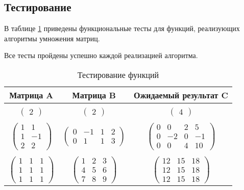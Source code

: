 \subsection{Тестирование}

В таблице \ref{tabular:func_test} приведены функциональные тесты для функций, реализующих алгоритмы умножения матриц. 

Все тесты пройдены успешно каждой реализацией алгоритма.

\begin{table}[h!]
	\begin{center}
	    \begin{threeparttable}
	    \captionsetup{justification=raggedright, singlelinecheck=off}
	    \caption{\label{tabular:func_test} Тестирование функций}
		\begin{tabular}{|c|c|c|}
			\hline
			Матрица A & Матрица B & Ожидаемый результат C \tabularnewline 
			\hline
			
			 &  & \tabularnewline[-1em]
			$\begin{pmatrix}
				2
			\end{pmatrix}$ &
			$\begin{pmatrix}
				2
			\end{pmatrix}$ &
			$\begin{pmatrix}
				4
			\end{pmatrix}$
			\tabularnewline[1em]
			\hline
			
			 &  & \\[-1em]
			$\begin{pmatrix}
				1 & 1\\
				1 & -1\\
				2 & 2
			\end{pmatrix}$ &
			$\begin{pmatrix}
				0 & -1 & 1 & 2\\
				0 & 1 & 1 & 3
			\end{pmatrix}$ &
			$\begin{pmatrix}
				0 & 0 & 2 & 5\\
				0 & -2 & 0 & -1\\
				0 & 0 & 4 & 10
			\end{pmatrix}$
			\tabularnewline[3em]
			\hline
			
			 &  & \\[-1em]
			$\begin{pmatrix}
				1 & 1 & 1\\
				1 & 1 & 1\\
				1 & 1 & 1
			\end{pmatrix}$ &
			$\begin{pmatrix}
				1 & 2 & 3\\
				4 & 5 & 6\\
				7 & 8 & 9
			\end{pmatrix}$ &
			$\begin{pmatrix}
				12 & 15 & 18\\
				12 & 15 & 18\\
				12 & 15 & 18
			\end{pmatrix}$
			\tabularnewline[3em]
			\hline
			

\end{tabular}
\end{threeparttable}
\end{center}
\end{table}
